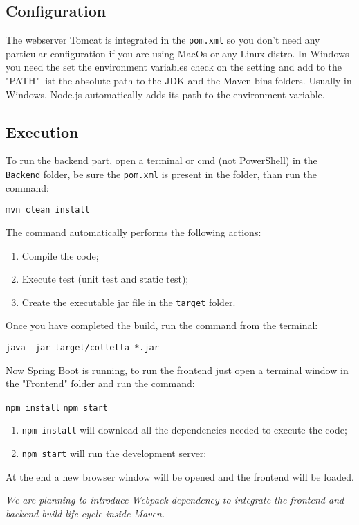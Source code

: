 \subsection{Configuration}
The webserver Tomcat is integrated in the \texttt{pom.xml} so you don't need any particular configuration if you are using MacOs or any Linux distro.
In Windows you need the set the environment variables check on the setting and add to the "PATH" list the absolute path to the JDK and the Maven bins folders.
Usually in Windows, Node.js automatically adds its path to the environment variable.
\subsection{Execution}
To run the backend part, open a terminal or cmd (not PowerShell) in the \texttt{Backend} folder, be sure the \texttt{pom.xml} is present in the folder, than run the command: 
\begin{center}
\texttt{mvn clean install}
\end{center} 
The command automatically performs the following actions:
\begin{enumerate}
\item Compile the code;
\item Execute test (unit test and static test);
\item Create the executable jar file in the \texttt{target} folder.
\end{enumerate}
Once you have completed the build, run the command from the terminal:\\
\begin{center}
\texttt{java -jar target/colletta-*.jar}
\end{center}
Now Spring Boot is running, to run the frontend just open a terminal window in the "Frontend" folder and run the command: 
\begin{center}
\texttt{npm install}
\texttt{npm start}
\end{center}
\begin{enumerate}
\item \texttt{npm install} will download all the dependencies needed to execute the code;
\item \texttt{npm start} will run the development server; 
\end{enumerate}
At the end a new browser window will be opened and the frontend will be loaded.

\textit{We are planning to introduce Webpack dependency to integrate the frontend and backend build life-cycle inside Maven.}